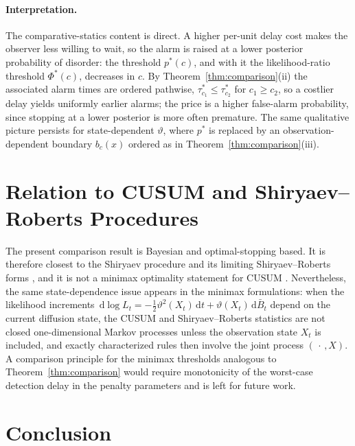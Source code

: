 \documentclass[pdflatex,sn-mathphys-num]{sn-jnl}
\theoremstyle{plain}
\theoremstyle{definition}
\newcommand{\dd}{\,\mathrm{d}}
\newcommand{\snr}{\vartheta}
\newcommand{\odds}{\Phi}
\newcommand{\bbar}{\bar{B}}
\begin{document}
\paragraph{Interpretation.}
The comparative-statics content is direct. A higher per-unit delay cost makes the
observer less willing to wait, so the alarm is raised at a lower posterior
probability of disorder: the threshold $p^\ast(c)$, and with it the
likelihood-ratio threshold $\odds^\ast(c)$, decreases in $c$. By
Theorem~\ref{thm:comparison}(ii) the associated alarm times are ordered pathwise,
$\tau^\ast_{c_1}\le\tau^\ast_{c_2}$ for $c_1\ge c_2$, so a costlier delay yields
uniformly earlier alarms; the price is a higher false-alarm probability, since
stopping at a lower posterior is more often premature. The same qualitative
picture persists for state-dependent $\snr$, where $p^\ast$ is replaced by an
observation-dependent boundary $b_c(x)$ ordered as in
Theorem~\ref{thm:comparison}(iii).

\section{Relation to CUSUM and Shiryaev--Roberts Procedures}\label{sec:cusum}

The present comparison result is Bayesian and optimal-stopping based. It is
therefore closest to the Shiryaev procedure and its limiting Shiryaev--Roberts
forms \citep{shiryaev1963optimum,pollak1985optimal,pollak2009optimality}, and it is not a
minimax optimality statement for CUSUM \citep{lorden1971procedures,moustakides1986optimal}.
Nevertheless, the same state-dependence issue appears in the minimax formulations:
when the likelihood increments
$\dd\log L_t=-\tfrac12\snr^2(X_t)\dd t+\snr(X_t)\dd\bbar_t$ depend on the current
diffusion state, the CUSUM and Shiryaev--Roberts statistics are not closed
one-dimensional Markov processes unless the observation state $X_t$ is included,
and exactly characterized rules then involve the joint process $(\,\cdot\,,X)$. A
comparison principle for the minimax thresholds analogous to
Theorem~\ref{thm:comparison} would require monotonicity of the worst-case
detection delay in the penalty parameters and is left for future work.

\section{Conclusion}\label{sec:concl}
\end{document}
